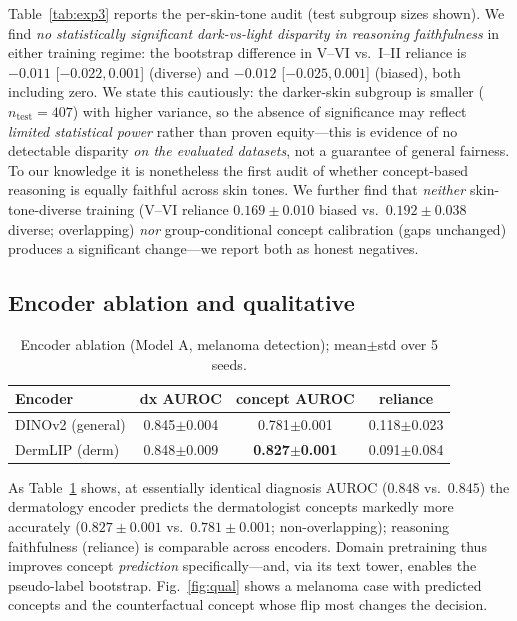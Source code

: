 \documentclass{svproc}
\begin{document}
Table~\ref{tab:exp3} reports the per-skin-tone audit (test subgroup sizes shown). We
find \emph{no statistically significant dark-vs-light disparity in reasoning
faithfulness} in either training regime: the bootstrap difference in V--VI vs.\ I--II
reliance is $-0.011$ [$-0.022, 0.001$] (diverse) and $-0.012$ [$-0.025, 0.001$]
(biased), both including zero. We state this cautiously: the darker-skin subgroup is
smaller ($n_{\text{test}}=407$) with higher variance, so the absence of significance
may reflect \emph{limited statistical power} rather than proven equity---this is
evidence of no detectable disparity \emph{on the evaluated datasets}, not a guarantee of
general fairness. To our knowledge it is nonetheless the first audit of whether
concept-based reasoning is equally faithful across skin tones. We further find that
\emph{neither} skin-tone-diverse training (V--VI reliance $0.169\pm0.010$ biased vs.\
$0.192\pm0.038$ diverse; overlapping) \emph{nor} group-conditional concept calibration
(gaps unchanged) produces a significant change---we report both as honest negatives.

\subsection{Encoder ablation and qualitative}
\begin{table}[t]
\caption{Encoder ablation (Model A, melanoma detection); mean$\pm$std over 5 seeds.}
\label{tab:exp4a}
\begin{center}
\begin{tabular}{lccc}
\hline\rule{0pt}{12pt}
Encoder & dx AUROC & concept AUROC & reliance\\[2pt]
\hline\rule{0pt}{12pt}
DINOv2 (general) & 0.845$\pm$0.004 & 0.781$\pm$0.001 & 0.118$\pm$0.023\\
DermLIP (derm) & 0.848$\pm$0.009 & \textbf{0.827$\pm$0.001} & 0.091$\pm$0.084\\[2pt]
\hline
\end{tabular}
\end{center}
\end{table}

As Table~\ref{tab:exp4a} shows, at essentially identical diagnosis AUROC ($0.848$ vs.\
$0.845$) the dermatology encoder predicts the dermatologist concepts markedly more
accurately ($0.827\pm0.001$ vs.\ $0.781\pm0.001$; non-overlapping); reasoning
faithfulness (reliance) is comparable across encoders. Domain pretraining thus improves
concept \emph{prediction} specifically---and, via its text tower, enables the
pseudo-label bootstrap. Fig.~\ref{fig:qual} shows a melanoma case with predicted
concepts and the counterfactual concept whose flip most changes the decision.
\end{document}
